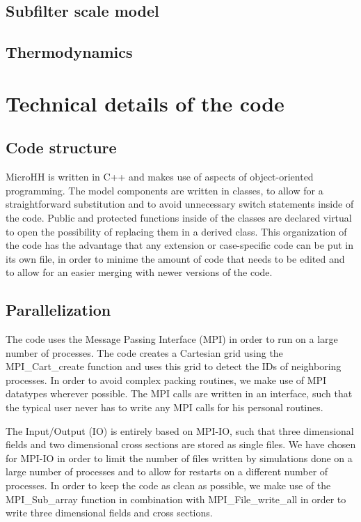 \documentclass[gmd]{copernicus}
\begin{document}
\subsection{Subfilter scale model}
\subsection{Thermodynamics}

\section{Technical details of the code}\label{sec:technical}
\subsection{Code structure}
MicroHH is written in C++ and makes use of aspects of object-oriented programming. The model components are written in classes, to allow for a straightforward substitution and to avoid unnecessary switch statements inside of the code. Public and protected functions inside of the classes are declared virtual to open the possibility of replacing them in a derived class. This organization of the code has the advantage that any extension or case-specific code can be put in its own file, in order to minime the amount of code that needs to be edited and to allow for an easier merging with newer versions of the code.

\subsection{Parallelization}
The code uses the Message Passing Interface (MPI) in order to run on a large number of processes. The code creates a Cartesian grid using the MPI\_Cart\_create function and uses this grid to detect the IDs of neighboring processes. In order to avoid complex packing routines, we make use of MPI datatypes wherever possible. The MPI calls are written in an interface, such that the typical user never has to write any MPI calls for his personal routines.

The Input/Output (IO) is entirely based on MPI-IO, such that three dimensional fields and two dimensional cross sections are stored as single files. We have chosen for MPI-IO in order to limit the number of files written by simulations done on a large number of processes and to allow for restarts on a different number of processes. In order to keep the code as clean as possible, we make use of the MPI\_Sub\_array function in combination with MPI\_File\_write\_all in order to write three dimensional fields and cross sections.
\end{document}
